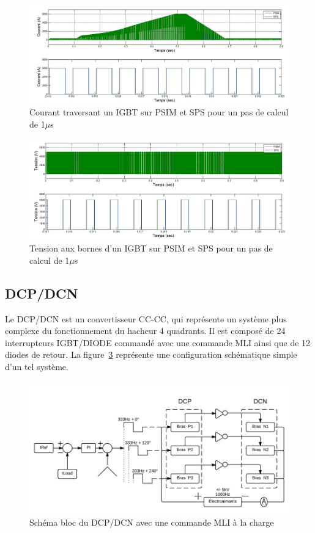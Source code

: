 \documentclass[11pt,letterpaper,final]{report}
\begin{document}
\begin{figure}[htb]
\centering
\includegraphics[scale=0.5]{Fig/Hacheur4Quadrants/HacheurCourantIGBT1u.jpg}
\caption{Courant traversant un IGBT sur PSIM et SPS pour un pas de calcul de 1$\mu$s}
\label{hc_IG_cou_1}
\end{figure}

\begin{figure}[htb]
\centering
\includegraphics[scale=0.5]{Fig/Hacheur4Quadrants/HacheurTensionIGBT1u.jpg}
\caption{Tension aux bornes d'un IGBT sur PSIM et SPS pour un pas de calcul de 1$\mu$s}
\label{hc_IG_ten_1}
\end{figure}


\clearpage

\subsection{DCP/DCN}
Le DCP/DCN est un convertisseur CC-CC, qui représente un système plus complexe du fonctionnement du hacheur 4 quadrants. Il est composé de 24 interrupteurs IGBT/DIODE commandé avec une commande MLI ainsi que de 12 diodes de retour. La figure~\ref{DC_DP} représente une configuration schématique simple d'un tel système.

\begin{figure}[htb]
\centering
\includegraphics[scale=0.5]{Fig/DCPDCN/DCP.jpg}
\caption{Schéma bloc du DCP/DCN avec une commande MLI à la charge}
\label{DC_DP}
\end{figure}
\end{document}
